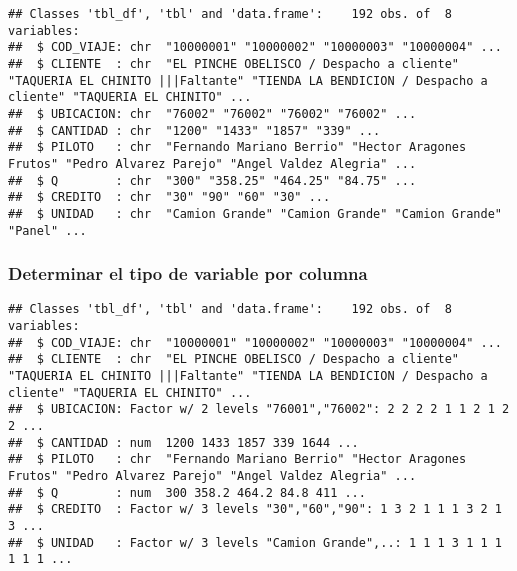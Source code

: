 \documentclass[]{article}
\newenvironment{Shaded}{\begin{snugshade}}{\end{snugshade}}
\newcommand{\KeywordTok}[1]{\textcolor[rgb]{0.13,0.29,0.53}{\textbf{#1}}}
\newcommand{\StringTok}[1]{\textcolor[rgb]{0.31,0.60,0.02}{#1}}
\newcommand{\CommentTok}[1]{\textcolor[rgb]{0.56,0.35,0.01}{\textit{#1}}}
\newcommand{\OperatorTok}[1]{\textcolor[rgb]{0.81,0.36,0.00}{\textbf{#1}}}
\newcommand{\NormalTok}[1]{#1}
\begin{document}
\begin{verbatim}
## Classes 'tbl_df', 'tbl' and 'data.frame':    192 obs. of  8 variables:
##  $ COD_VIAJE: chr  "10000001" "10000002" "10000003" "10000004" ...
##  $ CLIENTE  : chr  "EL PINCHE OBELISCO / Despacho a cliente" "TAQUERIA EL CHINITO |||Faltante" "TIENDA LA BENDICION / Despacho a cliente" "TAQUERIA EL CHINITO" ...
##  $ UBICACION: chr  "76002" "76002" "76002" "76002" ...
##  $ CANTIDAD : chr  "1200" "1433" "1857" "339" ...
##  $ PILOTO   : chr  "Fernando Mariano Berrio" "Hector Aragones Frutos" "Pedro Alvarez Parejo" "Angel Valdez Alegria" ...
##  $ Q        : chr  "300" "358.25" "464.25" "84.75" ...
##  $ CREDITO  : chr  "30" "90" "60" "30" ...
##  $ UNIDAD   : chr  "Camion Grande" "Camion Grande" "Camion Grande" "Panel" ...
\end{verbatim}

\subsubsection{Determinar el tipo de variable por
columna}\label{determinar-el-tipo-de-variable-por-columna}

\begin{Shaded}
\end{Shaded}

\begin{verbatim}
## Classes 'tbl_df', 'tbl' and 'data.frame':    192 obs. of  8 variables:
##  $ COD_VIAJE: chr  "10000001" "10000002" "10000003" "10000004" ...
##  $ CLIENTE  : chr  "EL PINCHE OBELISCO / Despacho a cliente" "TAQUERIA EL CHINITO |||Faltante" "TIENDA LA BENDICION / Despacho a cliente" "TAQUERIA EL CHINITO" ...
##  $ UBICACION: Factor w/ 2 levels "76001","76002": 2 2 2 2 1 1 2 1 2 2 ...
##  $ CANTIDAD : num  1200 1433 1857 339 1644 ...
##  $ PILOTO   : chr  "Fernando Mariano Berrio" "Hector Aragones Frutos" "Pedro Alvarez Parejo" "Angel Valdez Alegria" ...
##  $ Q        : num  300 358.2 464.2 84.8 411 ...
##  $ CREDITO  : Factor w/ 3 levels "30","60","90": 1 3 2 1 1 1 3 2 1 3 ...
##  $ UNIDAD   : Factor w/ 3 levels "Camion Grande",..: 1 1 1 3 1 1 1 1 1 1 ...
\end{verbatim}
\end{document}
